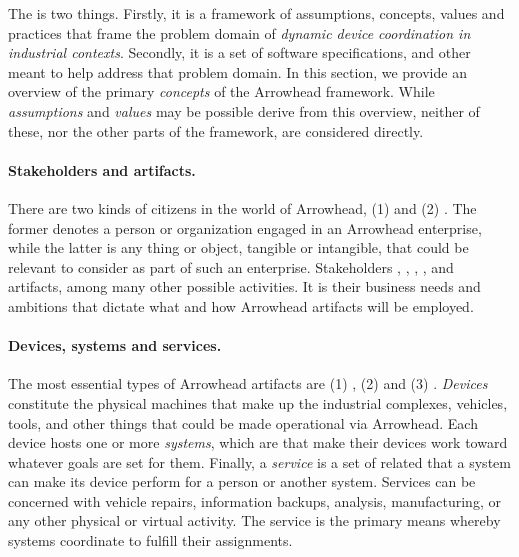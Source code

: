 %
%

The  is two things.
Firstly, it is a framework of assumptions, concepts, values and practices that frame the problem domain of \textit{dynamic device coordination in industrial contexts}.
Secondly, it is a set of software specifications,  and other  meant to help address that problem domain.
In this section, we provide an overview of the primary \textit{concepts} of the Arrowhead framework.
While \textit{assumptions} and \textit{values} may be possible derive from this overview, neither of these, nor the other parts of the framework, are considered directly.

\paragraph{Stakeholders and artifacts.}
There are two kinds of citizens in the world of Arrowhead, (1)  and (2) .
The former denotes a person or organization engaged in an Arrowhead enterprise, while the latter is any thing or object, tangible or intangible, that could be relevant to consider as part of such an enterprise.
Stakeholders , , , , and  artifacts, among many other possible activities.
It is their business needs and ambitions that dictate what and how Arrowhead artifacts will be employed.

\paragraph{Devices, systems and services.}
The most essential types of Arrowhead artifacts are (1) , (2)  and (3) .
\textit{Devices} constitute the physical machines that make up the industrial complexes, vehicles, tools, and other things that could be made operational via Arrowhead.
Each device hosts one or more \textit{systems}, which are   that make their devices work toward whatever goals are set for them.
Finally, a \textit{service} is a set of related  that a system can make its device perform for a person or another system.
Services can be concerned with vehicle repairs, information backups, analysis, manufacturing, or any other physical or virtual activity.
The service is the primary means whereby systems coordinate to fulfill their assignments.

